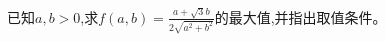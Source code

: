 \documentclass{article}
\begin{document}
已知$a,b>0$,求$f(a,b)=\frac{a+\sqrt{3}b}{2\sqrt{a^2+b^2}}$的最大值,并指出取值条件。
\end{document}
